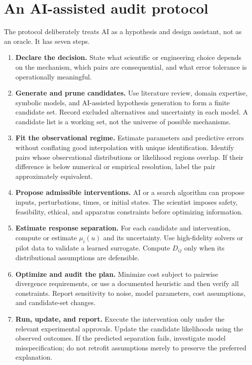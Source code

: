\documentclass[11pt]{article}
\begin{document}
\section{An AI-assisted audit protocol}
The protocol deliberately treats AI as a hypothesis and design assistant, not as an oracle. It has seven steps.
\begin{enumerate}
\item \textbf{Declare the decision.} State what scientific or engineering choice depends on the mechanism, which pairs are consequential, and what error tolerance is operationally meaningful.
\item \textbf{Generate and prune candidates.} Use literature review, domain expertise, symbolic models, and AI-assisted hypothesis generation to form a finite candidate set. Record excluded alternatives and uncertainty in each model. A candidate list is a working set, not the universe of possible mechanisms.
\item \textbf{Fit the observational regime.} Estimate parameters and predictive errors without conflating good interpolation with unique identification. Identify pairs whose observational distributions or likelihood regions overlap. If their difference is below numerical or empirical resolution, label the pair approximately equivalent.
\item \textbf{Propose admissible interventions.} AI or a search algorithm can propose inputs, perturbations, times, or initial states. The scientist imposes safety, feasibility, ethical, and apparatus constraints before optimizing information.
\item \textbf{Estimate response separation.} For each candidate and intervention, compute or estimate $\mu_i(u)$ and its uncertainty. Use high-fidelity solvers or pilot data to validate a learned surrogate. Compute $D_{ij}$ only when its distributional assumptions are defensible.
\item \textbf{Optimize and audit the plan.} Minimize cost subject to pairwise divergence requirements, or use a documented heuristic and then verify all constraints. Report sensitivity to noise, model parameters, cost assumptions, and candidate-set changes.
\item \textbf{Run, update, and report.} Execute the intervention only under the relevant experimental approvals. Update the candidate likelihoods using the observed outcomes. If the predicted separation fails, investigate model misspecification; do not retrofit assumptions merely to preserve the preferred explanation.
\end{enumerate}
\end{document}
